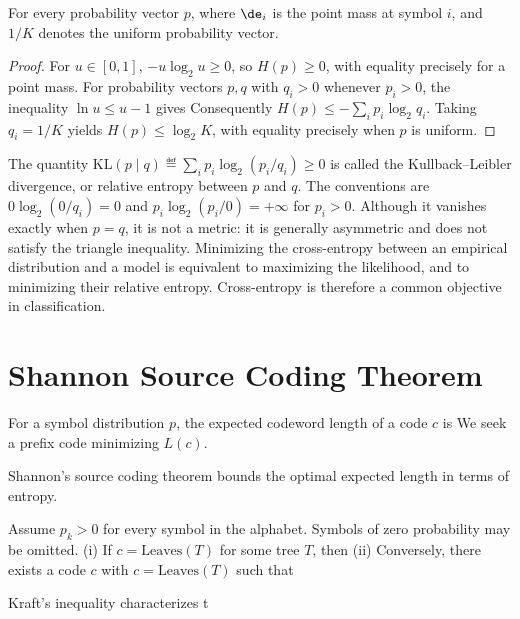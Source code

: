 \begin{lem} For every probability vector $p$,
where $\de_i$ is the point mass at symbol $i$, and $1/K$ denotes the uniform probability vector.
\end{lem}


\begin{proof}
For $u\in[0,1]$, $-u\log_2u\geq0$, so $H(p)\geq0$, with equality precisely for a point mass.
For probability vectors $p,q$ with $q_i>0$ whenever $p_i>0$, the inequality $\ln u\leq u-1$ gives
Consequently $H(p)\leq-\sum_i p_i\log_2q_i$. Taking $q_i=1/K$ yields $H(p)\leq\log_2K$, with equality precisely when $p$ is uniform.
\end{proof}

The quantity $\mathrm{KL}(p\mid q)\eqdef\sum_i p_i\log_2(p_i/q_i)\geq0$ is called the Kullback--Leibler divergence, or relative entropy between $p$ and $q$. The conventions are $0\log_2(0/q_i)=0$ and $p_i\log_2(p_i/0)=+\infty$ for $p_i>0$. Although it vanishes exactly when $p=q$, it is not a metric: it is generally asymmetric and does not satisfy the triangle inequality. Minimizing the cross-entropy between an empirical distribution and a model is equivalent to maximizing the likelihood, and to minimizing their relative entropy. Cross-entropy is therefore a common objective in classification.


                                                                    
\section{Shannon Source Coding Theorem}

For a symbol distribution $p$, the expected codeword length of a code $c$ is
We seek a prefix code minimizing $L(c)$.
 
Shannon's source coding theorem bounds the optimal expected length in terms of entropy.

\begin{thm}\label{thm-shannon-source-coding}
Assume $p_k>0$ for every symbol in the alphabet. Symbols of zero probability may be omitted.
	(i) If $c=\text{Leaves}(T)$ for some tree $T$, then 
	(ii) Conversely, there exists a code $c$ with $c=\text{Leaves}(T)$ such that 
\end{thm} 

Kraft's inequality characterizes t